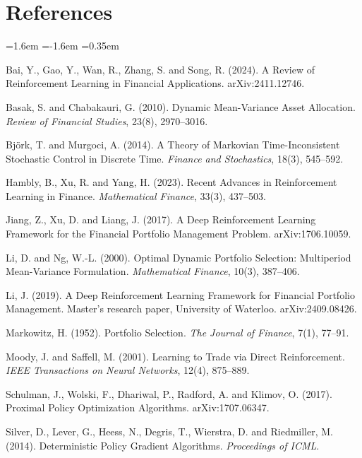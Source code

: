 \documentclass[11pt,a4paper]{article}
\theoremstyle{plain}
\theoremstyle{definition}
\begin{document}
\section*{References}
\begin{list}{}{\leftmargin=1.6em \itemindent=-1.6em \itemsep=0.35em}

\item Bai, Y., Gao, Y., Wan, R., Zhang, S. and Song, R. (2024). A Review of
Reinforcement Learning in Financial Applications. arXiv:2411.12746.

\item Basak, S. and Chabakauri, G. (2010). Dynamic Mean-Variance Asset Allocation.
\emph{Review of Financial Studies}, 23(8), 2970--3016.

\item Björk, T. and Murgoci, A. (2014). A Theory of Markovian Time-Inconsistent
Stochastic Control in Discrete Time. \emph{Finance and Stochastics}, 18(3), 545--592.

\item Hambly, B., Xu, R. and Yang, H. (2023). Recent Advances in Reinforcement Learning
in Finance. \emph{Mathematical Finance}, 33(3), 437--503.

\item Jiang, Z., Xu, D. and Liang, J. (2017). A Deep Reinforcement Learning Framework
for the Financial Portfolio Management Problem. arXiv:1706.10059.

\item Li, D. and Ng, W.-L. (2000). Optimal Dynamic Portfolio Selection: Multiperiod
Mean-Variance Formulation. \emph{Mathematical Finance}, 10(3), 387--406.

\item Li, J. (2019). A Deep Reinforcement Learning Framework for Financial Portfolio
Management. Master's research paper, University of Waterloo. arXiv:2409.08426.

\item Markowitz, H. (1952). Portfolio Selection. \emph{The Journal of Finance}, 7(1),
77--91.

\item Moody, J. and Saffell, M. (2001). Learning to Trade via Direct Reinforcement.
\emph{IEEE Transactions on Neural Networks}, 12(4), 875--889.

\item Schulman, J., Wolski, F., Dhariwal, P., Radford, A. and Klimov, O. (2017).
Proximal Policy Optimization Algorithms. arXiv:1707.06347.

\item Silver, D., Lever, G., Heess, N., Degris, T., Wierstra, D. and Riedmiller, M.
(2014). Deterministic Policy Gradient Algorithms. \emph{Proceedings of ICML}.


\end{list}
\end{document}
